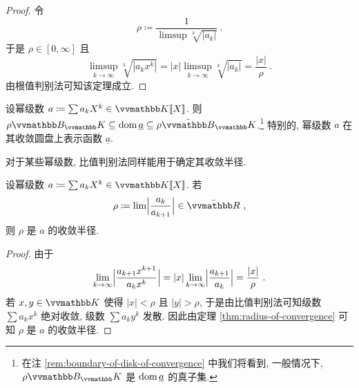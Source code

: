\begin{proof}
    令
    \[
        \rho \coloneqq \frac{1}{\limsup \sqrt[k]{|a_k|}}\ .
    \]
    于是 \(\rho \in [0, \infty]\) 且
    \[
        \limsup_{k \to \infty} \sqrt[k]{|a_k x^k|} = |x| \limsup_{k \to \infty} \sqrt[k]{|a_k|} = \frac{|x|}{\rho}\ .
    \]
    由根值判别法可知该定理成立.
\end{proof}

\begin{corollary}
    设幂级数 \(a \coloneqq \sum a_k X^k \in \K[\![X]\!]\). 则 \(\rho \B_\K \subseteq \dom \underline a \subseteq \rho \bar \B_\K\).\footnote{在注 \ref{rem:boundary-of-disk-of-convergence} 中我们将看到, 一般情况下, \(\rho \B_\K\) 是 \(\operatorname{dom} \underline a\) 的真子集.} 特别的, 幂级数 \(a\) 在其收敛圆盘上表示函数 \(\underline a\).
\end{corollary}

对于某些幂级数, 比值判别法同样能用于确定其收敛半径.

\begin{proposition}\label{prop:ratio-test-of-radius-of-convergence}
    设幂级数 \(a \coloneqq \sum a_k X^k \in \K[\![X]\!]\). 若
    \[
        \rho \coloneqq \lim \Bigl|\frac{a_k}{a_{k + 1}}\Bigr| \in \bar \R\ ,
    \]
    则 \(\rho\) 是 \(a\) 的收敛半径.
\end{proposition}

\begin{proof}
    由于
    \[
        \lim_{k \to \infty} \Bigl|\frac{a_{k + 1} x^{k + 1}}{a_k x^k}\Bigr| = |x| \lim_{k \to \infty} \Bigl|\frac{a_{k + 1}}{a_k}\Bigr| = \frac{|x|}{\rho}\ .
    \]
    若 \(x, y \in \K\) 使得 \(|x| < \rho\) 且 \(|y| > \rho\), 于是由比值判别法可知级数 \(\sum a_k x^k\) 绝对收敛, 级数 \(\sum a_k y^k\) 发散. 因此由定理 \ref{thm:radius-of-convergence} 可知 \(\rho\) 是 \(a\) 的收敛半径.
\end{proof}

